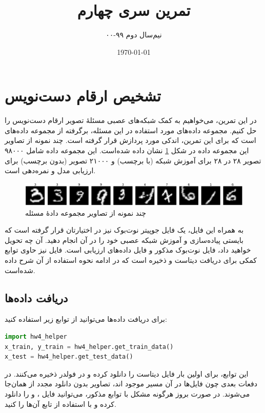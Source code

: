\documentclass{article}
\author{
نیم‌سال دوم ۹۹-۰۰
}
\title{
تمرین سری چهارم
}
\date{\today}
\begin{document}

\section*{تشخیص ارقام دست‌نویس}

در این تمرین، می‌خواهیم به کمک شبکه‌های عصبی مسئلهٔ
تصویر ارقام دست‌نویس را حل کنیم. مجموعه داده‌های مورد استفاده در این مسئله، برگرفته از مجموعه داده‌های
\hyperref{http://yann.lecun.com/exdb/mnist/}{}{}{}
است که برای این تمرین، اندکی مورد پردازش قرار گرفته است. چند نمونه از تصاویر این مجموعه داده در شکل
\ref{fig:MNIST}
نشان داده شده‌است. این مجموعه داده شامل ۹۸۰۰۰ تصویر ۲۸ در ۲۸ برای آموزش شبکه (با برچسب) و ۲۱۰۰۰ تصویر (بدون برچسب) برای ارزیابی مدل و نمره‌دهی است.

\begin{figure}[ht]
\begin{center}
\includegraphics[width=\linewidth]{images/figure.png}
\caption{چند نمونه از تصاویر مجموعه دادهٔ مسئله}
\label{fig:MNIST}
\end{center}
\end{figure}

به همراه این فایل، یک فایل جوپیتر نوت‌بوک نیز در اختیارتان قرار گرفته است که بایستی پیاده‌سازی و آموزش شبکه عصبی خود را در آن انجام دهید. آن چه تحویل خواهید داد، فایل نوت‌بوک مذکور و فایل
داده‌های ارزیابی است. فایل
نیز حاوی توابع کمکی برای دریافت دیتاست و ذخیره
است که در ادامه نحوه استفاده از آن شرح داده شده‌است.

\subsection*{دریافت داده‌ها}

برای دریافت داده‌ها می‌توانید از توابع زیر استفاده کنید:

\begin{latin}
\begin{lstlisting}[language=Python]
import hw4_helper
x_train, y_train = hw4_helper.get_train_data()
x_test = hw4_helper.get_test_data()
\end{lstlisting}
\end{latin}

این توابع، برای اولین بار فایل دیتاست را دانلود کرده و در فولدر
ذخیره می‌کنند. در دفعات بعدی چون فایل‌ها در آن مسیر موجود اند، تصاویر بدون دانلود مجدد از همان‌جا
می‌شوند. در صورت بروز هرگونه مشکل با توابع مذکور، می‌توانید فایل
\hyperref{https://drive.google.com/file/d/1-0iZwp7vygQqXNLaDmORp_d_EDQVrBXz/view?usp=sharing}{}{}{}،
\hyperref{https://drive.google.com/file/d/1-4be9NCtS_fhFePJP1T_92iAhwCvwGuQ/view?usp=sharing}{}{}{}
و
\hyperref{https://drive.google.com/file/d/1-4A5ZY2jdOFKnupZ2eBB2P4EJI-4im7p/view?usp=sharing}{}{}{}
را دانلود کرده و با استفاده از تابع
آن‌ها را
کنید.
\end{document}
